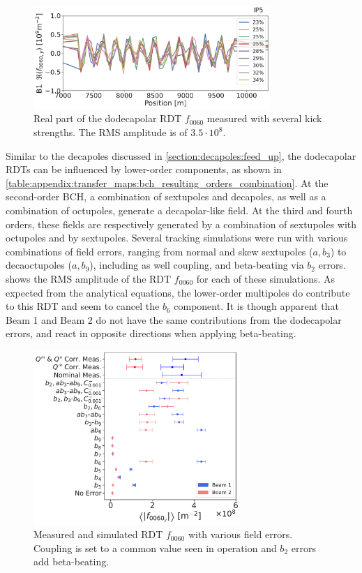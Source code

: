 \begin{figure}[!htb]
    \centering
    \includegraphics[width=0.8\textwidth]{./images/f0060y_all_meas_real.pdf}
    \caption{Real part of the dodecapolar RDT $f_{0060}$ measured with several kick strengths. The
    RMS amplitude is of $3.5\cdot10^{8}$.}
    \label{fig:high_orders:dodecapolar_f0060}
\end{figure}

Similar to the decapoles discussed in \cref{section:decapoles:feed_up}, the dodecapolar RDTs can be
influenced by lower-order components, as shown in
\cref{table:appendix:transfer_maps:bch_resulting_orders_combination}. At the second-order BCH, a
combination of sextupoles and decapoles, as well as a combination of octupoles, generate a
decapolar-like field. At the third and fourth orders, these fields are respectively generated by a
combination of sextupoles with octupoles and by sextupoles.
Several tracking simulations were run with various combinations of field errors, ranging from normal
and skew sextupoles ($a,b_3$) to decaoctupoles ($a,b_9$), including as well coupling, and
beta-beating via $b_2$ errors.  shows the RMS amplitude of
the RDT $f_{0060}$ for each of these simulations. As expected from the analytical equations, the
lower-order multipoles do contribute to this RDT and seem to cancel the $b_6$ component. It is though 
apparent that Beam 1 and Beam 2 do not have the same contributions from the dodecapolar errors, and
react in opposite directions when applying beta-beating.

\begin{figure}[H]
    \centering
    \includegraphics[width=0.7\textwidth]{./images/simulations_f0060.pdf}
    \caption{Measured and simulated RDT $f_{0060}$ with various field errors. Coupling is set to a
    common value seen in operation and $b_2$ errors add beta-beating.}
    \label{fig:high_orders:simulations_f0060}
\end{figure}

